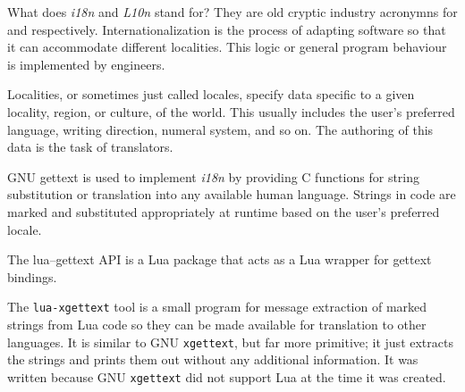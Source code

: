 

What does {\it i18n} and {\it L10n} stand for? They are old cryptic industry acronymns for  and  respectively. Internationalization is the process of adapting software so that it can accommodate different localities. This logic or general program behaviour is implemented by engineers.

Localities, or sometimes just called locales, specify data specific to a given locality, region, or culture, of the world. This usually includes the user's preferred language, writing direction, numeral system, and so on. The authoring of this data is the task of translators.

\startitemize[4]

GNU gettext is used to implement {\it i18n} by providing C functions for string substitution or translation into any available human language. Strings in code are marked and substituted appropriately at runtime based on the user's preferred locale.


The lua--gettext API is a Lua package that acts as a Lua wrapper for gettext bindings.


The {\tt lua-xgettext} tool is a small program for message extraction of marked strings from Lua code so they can be made available for translation to other languages. It is similar to GNU {\tt xgettext}, but far more primitive; it just extracts the strings and prints them out without any additional information. It was written because GNU {\tt xgettext} did not support Lua at the time it was created.
\stopitemize

